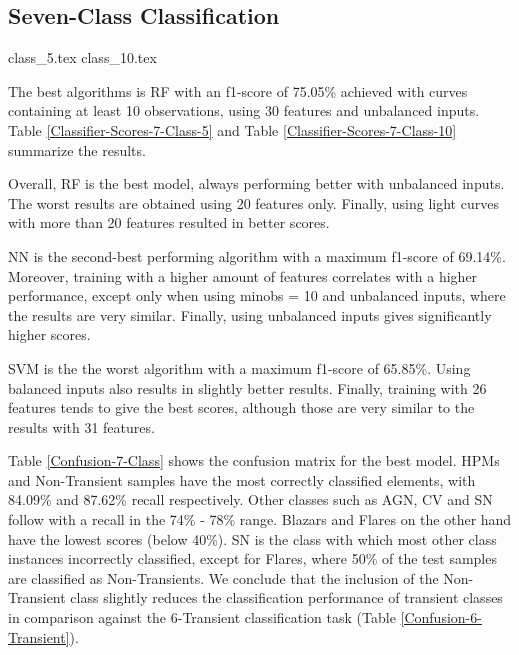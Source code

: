 \documentclass[a4paper,fleqn,usenatbib]{mnras}
\begin{document}
\subsection{Seven-Class Classification}

{class_5.tex}
{class_10.tex}

The best algorithms is RF with an f1-score of 75.05\% achieved with 
curves containing at least 10 observations, using 30 features and
unbalanced inputs. 
Table \ref{Classifier-Scores-7-Class-5} and Table
\ref{Classifier-Scores-7-Class-10} summarize the results.

Overall, RF is the best model, always performing better with unbalanced
inputs.  
The worst results are obtained using 20 features only.
Finally, using light curves with more than 20 features resulted in
better scores.

NN is the second-best performing algorithm with a maximum f1-score of
69.14\%. 
Moreover, training with a higher amount of features correlates with a
higher performance, except only when using min\textunderscore obs = 10
and unbalanced inputs, where the results are very similar. 
Finally, using unbalanced inputs gives significantly higher scores.  

SVM is the the worst algorithm with a maximum f1-score of 65.85\%. 
Using balanced inputs also results in slightly better results. 
Finally, training with 26 features tends to give the best scores,
although those are very similar to the results with 31 features.  

Table \ref{Confusion-7-Class} shows the confusion matrix for the best
model. 
HPMs and Non-Transient samples have the most correctly classified elements, with 84.09\%
and 87.62\% recall respectively. 
Other classes such as AGN, CV and SN follow with a recall in the 74\%
- 78\% range. 
Blazars and Flares on the other hand have the lowest scores (below
40\%). 
SN is the class with which most other class instances incorrectly
classified, except for Flares, where 50\% of the test samples are
classified as Non-Transients. 
We conclude that the inclusion of the Non-Transient class slightly
reduces the  classification performance of transient classes in
comparison against the  6-Transient classification task
(Table \ref{Confusion-6-Transient}).  
\end{document}
